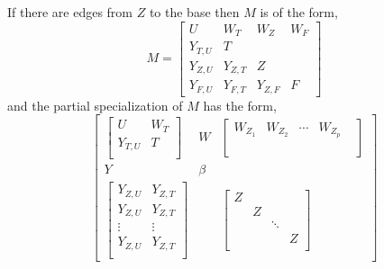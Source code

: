 \documentclass{paper}
\begin{document}
If there are edges from $Z$ to the base then $M$ is of the form,
\[M=
\begin{bmatrix}
U & W_{T}& W_{Z} & W_{F} \\
Y_{T,U} & T & & \\
Y_{Z,U} & Y_{Z,T} & Z & \\
Y_{F,U} & Y_{F,T} & Y_{Z,F} & F
\end{bmatrix}
\] and the partial specialization of $M$ has the form,
\[
\begin{bmatrix}
\begin{bmatrix}
U & W_T \\
Y_{T,U} & T \\
\end{bmatrix} 
& 
W
&
\begin{bmatrix}
W_{Z_1} & W_{Z_2} & \cdots & W_{Z_p} \\
& & & & \\
& & & & \\
\end{bmatrix} \\
Y & \beta & \\
\begin{bmatrix}
Y_{Z,U}&Y_{Z,T} \\
Y_{Z,U}&Y_{Z,T} \\
\vdots & \vdots \\
Y_{Z,U}&Y_{Z,T} \\
\end{bmatrix} 
& &
\begin{bmatrix}
Z & & & \\
& Z & & \\
& & \ddots & \\
& & & Z \\

\end{bmatrix}


\end{bmatrix}
\]
\end{document}
